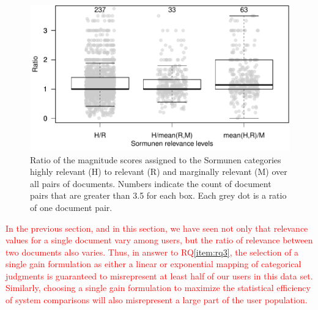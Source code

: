 \begin{figure}[t]
  \centering
  \includegraphics[width=.7\linewidth]{figs/kanoulos_aslam.pdf}
  \caption{Ratio of the magnitude scores assigned to 
    the Sormunen categories highly relevant (H) to relevant (R) and marginally relevant
    (M) over all pairs of documents. Numbers indicate the count of document pairs that 
    are greater than 3.5 for each box. Each grey dot is a ratio of one document pair.
  \label{fig:ka}
    }
\end{figure}


\textcolor{red}{ In the previous section, and in this section, we have
seen not only that relevance values for a single document vary among
users, but the ratio of relevance between two documents also varies.
Thus, in answer to RQ\ref{item:rq3}, the selection of a single gain
formulation as either a linear or exponential mapping of categorical
judgments is guaranteed to misrepresent at least half of our users in
this data set.
Similarly, choosing a single gain formulation to maximize the
statistical efficiency of system comparisons will also misrepresent a
large part of the user population.
} 




